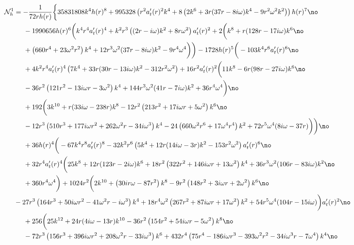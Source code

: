 \documentclass[preprintnumbers,aps,prd,longbibliography,nofootinbib,nobibnotes,amsmath,amssymb]{revtex4}
\begin{document}
		\begin{align}
		&\hspace{-1cm}\mathcal{N}_h^1 = -\frac{1}{72 r h(r)} \bigg\{35831808 k^4 h(r)^8+995328 \left(r^2 a_t'(r){}^2 k^4+8 \left(2 k^6+3 r (37 r-8 i \omega ) k^4-9 r^2 \omega ^2 k^2\right)\right) h(r)^7\no\\
		&-1990656 h(r)^6\bigg(k^4 r^4 a_t'(r)^4+k^2 r^3 \left((2 r-i \omega ) k^2+8 r \omega ^2\right) a_t'(r)^2+2 \bigg(k^8+r (128 r-17 i \omega ) k^6\no\\
		&+\left(660 r^4+23 \omega ^2 r^2\right) k^4+12 r^3 \omega ^2 (37 r-8 i \omega ) k^2-9 r^4 \omega ^4\bigg)\bigg) -1728 h(r)^5 \bigg(-103 k^4 r^6 a_t'(r){}^6\no\\
		&+4 k^2 r^4 a_t'(r)^4 \left(7 k^4+33 r (30 r-13 i \omega ) k^2-312 r^2 \omega ^2\right) +16 r^2 a_t'(r)^2 \bigg(11 k^8-6 r (98 r-27 i \omega ) k^6\no\\
		&-36 r^2 \left(121 r^2-13 i \omega  r-3 \omega ^2\right) k^4+144 r^3 \omega ^2 (41 r-7 i \omega ) k^2+36 r^4 \omega ^4\bigg) \no\\
		&+192 \bigg(3 k^{10}+r (33 i \omega -238 r) k^8-12 r^2 \left(213 r^2+17 i \omega  r+5 \omega ^2\right) k^6\no\\
		&-12 r^3 \left(510 r^3+177 i \omega  r^2+262 \omega ^2 r-34 i \omega ^3\right) k^4-24 \left(660 \omega ^2 r^6+17 \omega ^4 r^4\right) k^2+72 r^5 \omega ^4 (8 i \omega -37 r)\bigg)\bigg)\no\\
		& +36 h(r)^4 \bigg(-67 k^4 r^8 a_t'(r)^8-32 k^2 r^6 \left(5 k^4+12 r (14 i \omega -3 r) k^2-153 r^2 \omega ^2\right) a_t'(r)^6\no\\
		&+32 r^4 a_t'(r)^4 \bigg(25 k^8+12 r (123 r-2 i \omega ) k^6+18 r^2 \left(322 r^2+146 i \omega  r+13 \omega ^2\right) k^4+36 r^3 \omega ^2 (106 r-83 i \omega ) k^2\no\\
		&+360 r^4 \omega ^4\bigg) +1024 r^2 \bigg(2 k^{10}+\left(30 i r \omega -87 r^2\right) k^8-9 r^2 \left(148 r^2+3 i \omega  r+2 \omega ^2\right) k^6\no\\
		&\hspace{-0.5cm}-27 r^3 \left(164 r^3+50 i \omega  r^2-41 \omega ^2 r-i \omega ^3\right) k^4+18 r^4 \omega ^2 \left(267 r^2+87 i \omega  r+17 \omega ^2\right) k^2+54 r^5 \omega ^4 (104 r-15 i \omega )\bigg) a_t'(r)^2\no\\
		&+256 \bigg(25 k^{12}+24 r (4 i \omega -13 r) k^{10}-36 r^2 \left(154 r^2+54 i \omega  r-5 \omega ^2\right) k^8\no\\
		&-72 r^3 \left(156 r^3+396 i \omega  r^2+208 \omega ^2 r-33 i \omega ^3\right) k^6+432 r^4 \left(75 r^4-186 i \omega  r^3-393 \omega ^2 r^2-34 i \omega ^3 r-7 \omega ^4\right) k^4\no\\

\end{align}
\end{document}
